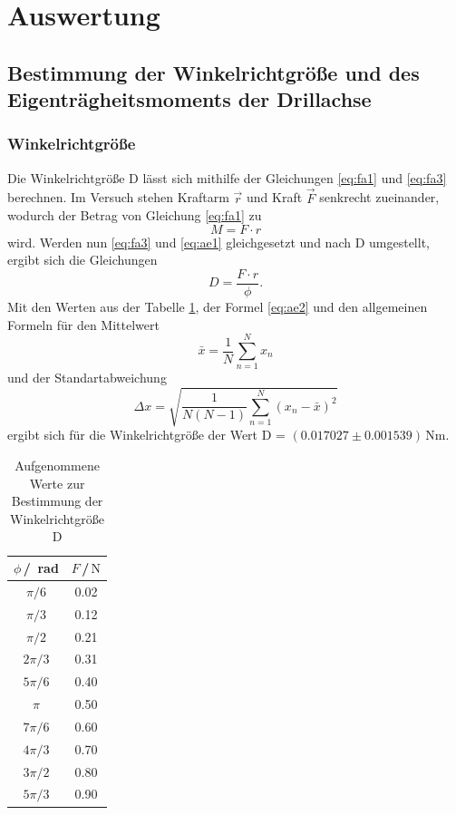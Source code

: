 \section{Auswertung}
\label{sec:Auswertung}

\subsection{Bestimmung der Winkelrichtgröße und des Eigenträgheitsmoments der Drillachse}


\subsubsection{Winkelrichtgröße}

Die Winkelrichtgröße D lässt sich mithilfe der Gleichungen \ref{eq:fa1} und \ref{eq:fa3} berechnen.
Im Versuch stehen Kraftarm $\vec{r}$ und Kraft $\vec{F}$ senkrecht zueinander, wodurch der Betrag
von Gleichung \ref{eq:fa1} 
zu
\begin{equation}
    M = F \cdot r
    \label{eq:ae1}
\end{equation}
\noindent
wird. Werden nun \ref{eq:fa3} und \ref{eq:ae1} gleichgesetzt und nach D umgestellt, ergibt sich
die Gleichungen
\begin{equation}
    D = \frac{F\cdot r}{\phi}.
    \label{eq:ae2}
\end{equation}
\noindent
Mit den Werten aus der Tabelle \ref{tab:a1}, der Formel \ref{eq:ae2} und den allgemeinen Formeln 
für den Mittelwert
\begin{equation}
    \bar{x} = \frac{1}{N} \sum_{n=1}^N x_n 
    \label{eq:ae3}
\end{equation}
\noindent
und der Standartabweichung
\begin{equation}
    \Delta x = \sqrt{\frac{1}{N(N-1)} \sum_{n=1}^N (x_n - \bar{x})^2}
    \label{eq:std}
\end{equation}
\noindent
ergibt sich für die Winkelrichtgröße der Wert D = $(0.017027 \pm 0.001539)\,$Nm.

\begin{table}[H]
\normalsize

\centering
{}
\begin{tabular}{c c}
\toprule
    $\phi$\,/\, rad & $F$\,/\,$\si{\newton}$ \\
    \midrule

$\pi/6$  &   0.02   \\
$\pi/3$  &   0.12   \\
$\pi/2$  &   0.21   \\
$2\pi/3$ &   0.31   \\
$5\pi/6$ &   0.40   \\
$\pi$    &   0.50   \\
$7\pi/6$ &   0.60   \\
$4\pi/3$ &   0.70   \\
$3\pi/2$ &   0.80   \\
$5\pi/3$ &   0.90   \\ 

    \bottomrule
\end{tabular}
\caption{Aufgenommene Werte zur Bestimmung der Winkelrichtgröße D}
\label{tab:a1}
\end{table}
\noindent

